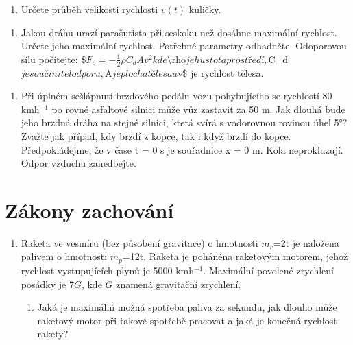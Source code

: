 \documentclass[letterpaper,10pt,english]{jupyterBook}
\begin{document}
{{\begin{enumerate}
\begin{enumerate}
\item {} 
\sphinxAtStartPar
Určete průběh velikosti rychlosti \(v(t)\) kuličky.

\end{enumerate}

\end{enumerate}

\sphinxAtStartPar


\sphinxAtStartPar
{}
\begin{enumerate}
%
\setcounter{enumi}{3}
\item {} 
\sphinxAtStartPar
Jakou dráhu urazí parašutista při seskoku než dosáhne maximální rychlost. Určete jeho maximální rychlost. Potřebné parametry odhadněte. Odoporovou sílu počítejte:
\$\(F_o = -\frac{1}{2}  \rho  C_d  A v^2\)\(
kde \)\textbackslash{}rho\( je hustota prostředí, \)C\_d\( je součinitel odporu, \)A\( je plocha tělesa a \)v\$ je rychlost tělesa.

\end{enumerate}

\sphinxAtStartPar
{}
\begin{enumerate}
%
\setcounter{enumi}{4}
\item {} 
\sphinxAtStartPar
Při úplném sešlápnutí brzdového pedálu vozu pohybujícího se rychlostí 80 kmh\(^{-1}\) po rovné asfaltové silnici může vůz zastavit za 50 m. Jak dlouhá bude jeho brzdná dráha na stejné silnici, která svírá s vodorovnou rovinou úhel 5°? Zvažte jak případ, kdy brzdí z kopce, tak i když brzdí do kopce. Předpokládejme, že v čase t = 0 s je souřadnice x = 0 m. Kola neprokluzují. Odpor vzduchu zanedbejte.

\end{enumerate}

\sphinxAtStartPar


\sphinxAtStartPar
{}


\section{Zákony zachování}
\label{\detokenize{Cviceni/C1:zakony-zachovani}}\begin{enumerate}
%
\item {} 
\sphinxAtStartPar
Raketa ve vesmíru (bez působení gravitace) o hmotnosti \(m_r\)=2t je naložena palivem o hmotnosti \(m_p\)=12t. Raketa je poháněna raketovým motorem, jehož rychlost vystupujících plynů je 5000 kmh\(^{−1}\). Maximální povolené zrychlení posádky je 7\(G\), kde \(G\) znamená gravitační zrychlení.
\begin{enumerate}
%
\item {} 
\sphinxAtStartPar
Jaká je maximální možná spotřeba paliva za sekundu, jak dlouho může raketový motor při takové spotřebě pracovat a jaká je konečná rychlost rakety?


\end{enumerate}
\end{enumerate}}}
\end{document}
